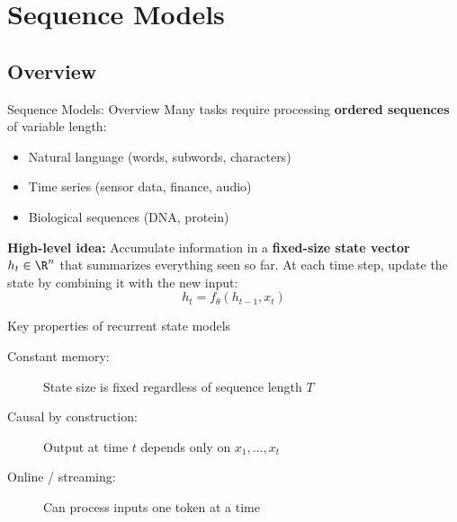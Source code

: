 
\section{Sequence Models}

\subsection{Overview}

\begin{frame}{Sequence Models: Overview}
  Many tasks require processing \textbf{ordered sequences} of variable length:
  \begin{itemize}
    \item Natural language (words, subwords, characters)
    \item Time series (sensor data, finance, audio)
    \item Biological sequences (DNA, protein)
  \end{itemize}

  \vspace{0.5em}
  \textbf{High-level idea:} Accumulate information in a \textbf{fixed-size state vector} $h_t \in \R^n$ that summarizes everything seen so far.
  At each time step, update the state by combining it with the new input:
  \[
    \boxed{h_t = f_\theta(h_{t-1}, x_t)}
  \]

  \vspace{0.3em}
  \begin{block}{Key properties of recurrent state models}
    \begin{description}
      \item[Constant memory:] State size is fixed regardless of sequence length $T$
      \item[Causal by construction:] Output at time $t$ depends only on $x_1, \ldots, x_t$
      \item[Online / streaming:] Can process inputs one token at a time
    \end{description}
  \end{block}
\end{frame}

